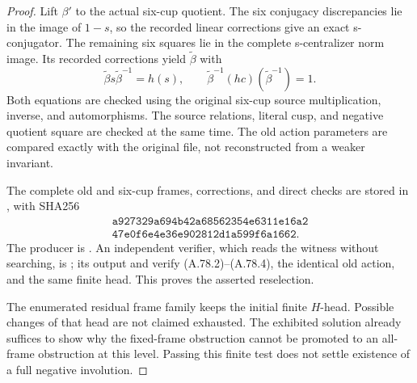 \begin{proof}
Lift \(\beta'\) to the actual six-cup quotient. The six
conjugacy discrepancies lie in the image of \(1-s\), so the
recorded linear corrections give an exact s-conjugator. The
remaining six squares lie in the complete s-centralizer norm
image. Its recorded corrections yield \(\widetilde\beta\) with
\[
 \widetilde\beta s\widetilde\beta^{-1}=h(s),\qquad
 \widetilde\beta^{-1}(hc)(\widetilde\beta^{-1})=1.
 \tag{A.78.4}
\]
Both equations are checked using the original six-cup source
multiplication, inverse, and automorphisms. The source relations,
literal cusp, and negative quotient square are checked at the
same time. The old action parameters are compared exactly with
the original file, not reconstructed from a weaker invariant.

The complete old and six-cup frames, corrections, and direct checks
are stored in
,
with SHA256
\[
\begin{gathered}
 \texttt{a927329a694b42a68562354e6311e16a2}\\
 \texttt{47e0f6e4e36e902812d1a599f6a1662}.
\end{gathered}
 \tag{A.78.5}
\]
The producer is
.
An independent verifier, which reads the witness without searching,
is
;
its output and
verify (A.78.2)--(A.78.4), the identical old action, and the same
finite head. This proves the asserted reselection.

The enumerated residual frame family keeps the initial finite
\(H\)-head. Possible changes of that head are not claimed
exhausted. The exhibited solution already suffices to show why
the fixed-frame obstruction cannot be promoted to an all-frame
obstruction at this level. Passing this finite test does not
settle existence of a full negative involution.
\end{proof}
